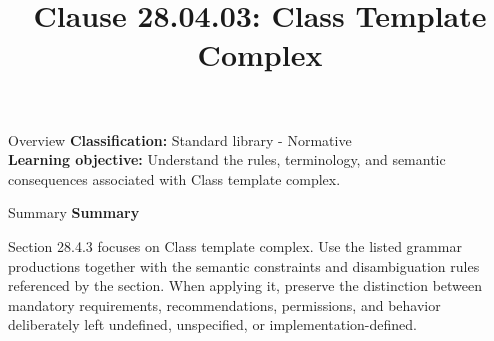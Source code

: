 \documentclass[10pt,letterpaper]{article}
\title{Clause 28.04.03: Class Template Complex}
\author{}
\date{}
\begin{document}
\maketitle
\begin{CornellOverviewBox}{Overview}
\textbf{Classification:} Standard library - Normative\\[2pt]
\textbf{Learning objective:} Understand the rules, terminology, and semantic consequences associated with Class template complex.
\end{CornellOverviewBox}\begin{CornellSummaryBox}{Summary}
{\sffamily\bfseries\color{Accent} Summary}\par\vspace{3pt}Section 28.4.3 focuses on Class template complex. Use the listed grammar productions together with the semantic constraints and disambiguation rules referenced by the section. When applying it, preserve the distinction between mandatory requirements, recommendations, permissions, and behavior deliberately left undefined, unspecified, or implementation-defined.
\end{CornellSummaryBox}
\end{document}
